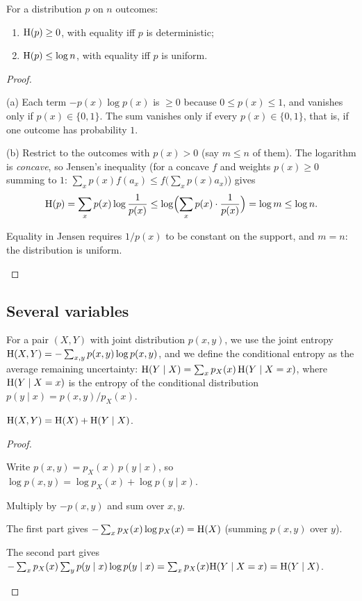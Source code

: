 \begin{proposition}\label{prop:shannon-props}
  For a distribution $p$ on $n$ outcomes:
  \begin{enumerate}
    \item[(a)] $\mathrm{H}(p)\ge0$, with equality iff $p$ is deterministic;
    \item[(b)] $\mathrm{H}(p)\le\log n$, with equality iff $p$ is uniform.
  \end{enumerate}
\end{proposition}
\begin{proof}
  \begin{steps}
    \item (a) Each term $-p(x)\log p(x)$ is $\ge0$ because $0\le p(x)\le1$, and vanishes only if $p(x)\in\{0,1\}$. The sum vanishes only if every $p(x)\in\{0,1\}$, that is, if one outcome has probability $1$.
    \item (b) Restrict to the outcomes with $p(x)>0$ (say $m\le n$ of them). The logarithm is \emph{concave}, so Jensen's inequality (for a concave $f$ and weights $p(x)\ge0$ summing to $1$: $\sum_xp(x)f(a_x)\le f\bigl(\sum_xp(x)a_x\bigr)$) gives
      \[
        \mathrm{H}(p)=\sum_xp(x)\log\frac1{p(x)}\le\log\Bigl(\sum_xp(x)\cdot\frac1{p(x)}\Bigr)=\log m\le\log n .
      \]
    \item Equality in Jensen requires $1/p(x)$ to be constant on the support, and $m=n$: the distribution is uniform. \qedhere
  \end{steps}
\end{proof}

\subsection{Several variables}

For a pair $(X,Y)$ with joint distribution $p(x,y)$, we use the joint entropy $\mathrm{H}(X,Y)=-\sum_{x,y}p(x,y)\log p(x,y)$, and we define the conditional entropy as the average remaining uncertainty:
$\mathrm{H}(Y\mid X)=\sum_xp_X(x)\,\mathrm{H}(Y\mid X=x)$, where $\mathrm{H}(Y\mid X=x)$ is the entropy of the conditional distribution $p(y\mid x)=p(x,y)/p_X(x)$.

\begin{proposition}\label{prop:chainrule}
  $\mathrm{H}(X,Y)=\mathrm{H}(X)+\mathrm{H}(Y\mid X)$.
\end{proposition}
\begin{proof}
  \begin{steps}
    \item Write $p(x,y)=p_X(x)\,p(y\mid x)$, so $\log p(x,y)=\log p_X(x)+\log p(y\mid x)$.
    \item Multiply by $-p(x,y)$ and sum over $x,y$.
    \item The first part gives $-\sum_xp_X(x)\log p_X(x)=\mathrm{H}(X)$ (summing $p(x,y)$ over $y$).
    \item The second part gives $-\sum_xp_X(x)\sum_yp(y\mid x)\log p(y\mid x)=\sum_xp_X(x)\mathrm{H}(Y\mid X=x)=\mathrm{H}(Y\mid X)$. \qedhere
  \end{steps}
\end{proof}

